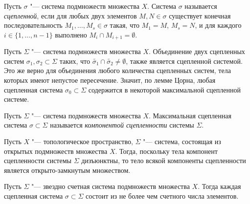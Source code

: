 \begin{definition}
    Пусть $\sigma$ "--- система подмножеств множества $X$. Система $\sigma$ называется \textit{сцепленной}, если для любых двух элементов $M, N \in \sigma$ существует конечная последовательность $M_1, \ldots, M_s \in \sigma$ такая, что $M_1 = M$, $M_s = N$, и для каждого $i \in \{1, \dotsc, n - 1\}$ выполнено $M_i \cap M_{i + 1} = \emptyset$.
\end{definition}

\begin{note}
    Пусть $\Sigma$ "--- система подмножеств множества $X$. Объединение двух сцепленных систем $\sigma_1, \sigma_2 \subset \Sigma$ таких, что $\widetilde{\sigma_1}\cap\widetilde{\sigma_2}\neq \emptyset$, также является сцепленной системой. Это же верно для объединения любого количества сцепленных систем, тела которых имеют непустое пересечение. Значит, по лемме Цорна, любая сцепленная система $\sigma_0 \subset \Sigma$ содержится в некоторой максимальной сцепленной системе.
\end{note}

\begin{definition}
    Пусть $\Sigma$ "--- система подмножеств множества $X$. Максимальная сцепленная система $\sigma \subset \Sigma$ называется \textit{компонентой сцепленности} системы $\Sigma$.
\end{definition}

\begin{note}
    Пусть $X$ "--- топологическое пространство, $\Sigma$ "--- система, состоящая из открытых подмножеств множества $X$. Тогда, поскольку тела компонент сцепленности системы $\Sigma$ дизъюнктны, то тело всякой компоненты сцепленности является открыто-замкнутым множеством.
\end{note}

\begin{proposition}
    Пусть $\Sigma$ "--- звездно счетная система подмножеств множества $X$. Тогда каждая сцепленная система $\sigma \subset \Sigma$ состоит из не более чем счетного числа элементов.
\end{proposition}

